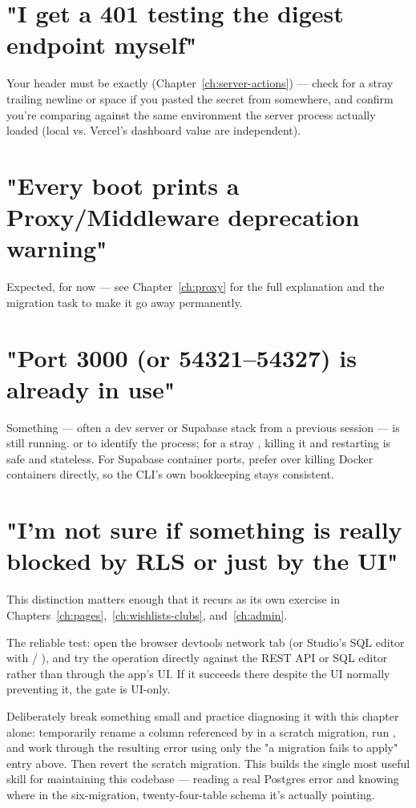 \section*{"I get a 401 testing the digest endpoint myself"}
Your  header must be exactly  (Chapter~\ref{ch:server-actions}) — check for a stray trailing newline or space if you pasted the secret from somewhere, and confirm you're comparing against the same environment the server process actually loaded (local  vs. Vercel's dashboard value are independent).

\section*{"Every  boot prints a Proxy/Middleware deprecation warning"}
Expected, for now — see Chapter~\ref{ch:proxy} for the full explanation and the migration task to make it go away permanently.

\section*{"Port 3000 (or 54321--54327) is already in use"}
Something — often a dev server or Supabase stack from a previous session — is still running.  or  to identify the process; for a stray , killing it and restarting is safe and stateless. For Supabase container ports, prefer  over killing Docker containers directly, so the CLI's own bookkeeping stays consistent.

\section*{"I'm not sure if something is really blocked by RLS or just by the UI"}
This distinction matters enough that it recurs as its own exercise in Chapters~\ref{ch:pages},~\ref{ch:wishlists-clubs}, and~\ref{ch:admin}.

\begin{olkhowto}
The reliable test: open the browser devtools network tab (or Studio's SQL editor with  / ), and try the operation directly against the REST API or SQL editor rather than through the app's UI. If it succeeds there despite the UI normally preventing it, the gate is UI-only.
\end{olkhowto}

\begin{olktask}
Deliberately break something small and practice diagnosing it with this chapter alone: temporarily rename a column referenced by  in a scratch migration, run , and work through the resulting error using only the "a migration fails to apply" entry above. Then revert the scratch migration. This builds the single most useful skill for maintaining this codebase — reading a real Postgres error and knowing where in the six-migration, twenty-four-table schema it's actually pointing.
\end{olktask}
